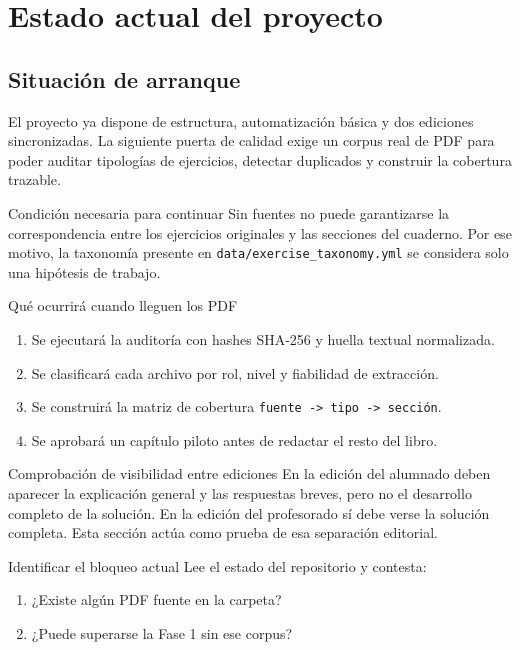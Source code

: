 \chapter{Estado actual del proyecto}

\section{Situación de arranque}

El proyecto ya dispone de estructura, automatización básica y dos ediciones sincronizadas.
La siguiente puerta de calidad exige un corpus real de PDF para poder auditar tipologías de
ejercicios, detectar duplicados y construir la cobertura trazable.

\begin{theorybox}{Condición necesaria para continuar}
Sin fuentes no puede garantizarse la correspondencia entre los ejercicios originales y las
secciones del cuaderno. Por ese motivo, la taxonomía presente en \texttt{data/exercise\_taxonomy.yml}
se considera solo una hipótesis de trabajo.
\end{theorybox}

\begin{methodbox}{Qué ocurrirá cuando lleguen los PDF}
\begin{enumerate}
  \item Se ejecutará la auditoría con hashes SHA-256 y huella textual normalizada.
  \item Se clasificará cada archivo por rol, nivel y fiabilidad de extracción.
  \item Se construirá la matriz de cobertura \texttt{fuente -> tipo -> sección}.
  \item Se aprobará un capítulo piloto antes de redactar el resto del libro.
\end{enumerate}
\end{methodbox}

\begin{solvedexample}{Comprobación de visibilidad entre ediciones}
En la edición del alumnado deben aparecer la explicación general y las respuestas breves,
pero no el desarrollo completo de la solución. En la edición del profesorado sí debe verse
la solución completa. Esta sección actúa como prueba de esa separación editorial.
\end{solvedexample}

\begin{guidedexercise}{Identificar el bloqueo actual}
Lee el estado del repositorio y contesta:
\begin{enumerate}
  \item ¿Existe algún PDF fuente en la carpeta?
  \item ¿Puede superarse la Fase 1 sin ese corpus?
\end{enumerate}
\end{guidedexercise}

